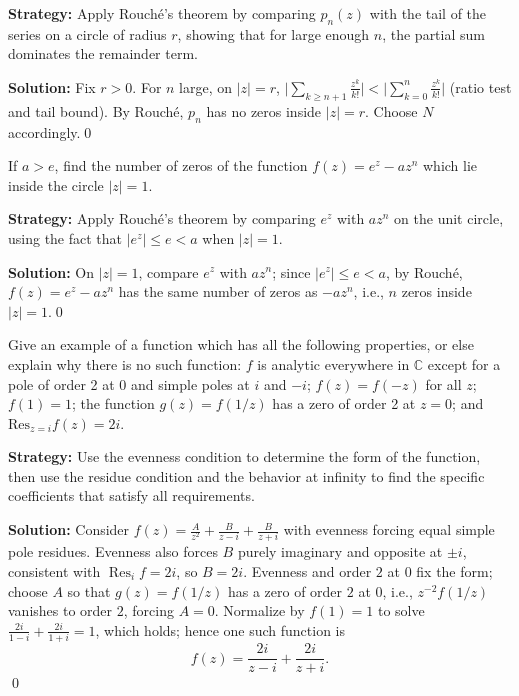 \noindent\textbf{Strategy:} Apply Rouché's theorem by comparing \( p_n(z) \) with the tail of the series on a circle of radius \( r \), showing that for large enough \( n \), the partial sum dominates the remainder term.

\bigskip\noindent\textbf{Solution:}
Fix $r>0$. For $n$ large, on $|z|=r$, $\big|\sum_{k\ge n+1} \frac{z^k}{k!}\big|<\big|\sum_{k=0}^{n} \frac{z^k}{k!}\big|$ (ratio test and tail bound). By Rouché, $p_n$ has no zeros inside $|z|=r$. Choose $N$ accordingly.\qed


\begin{problembox}
\begin{problemstatement}
If \( a > e \), find the number of zeros of the function \( f(z) = e^z - a z^n \) which lie inside the circle \( |z| = 1 \).
\end{problemstatement}
\end{problembox}

\noindent\textbf{Strategy:} Apply Rouché's theorem by comparing \( e^z \) with \( a z^n \) on the unit circle, using the fact that \( |e^z| \leq e < a \) when \( |z| = 1 \).

\bigskip\noindent\textbf{Solution:}
On $|z|=1$, compare $e^z$ with $a z^n$; since $|e^z|\le e< a$, by Rouché, $f(z)=e^z-az^n$ has the same number of zeros as $-az^n$, i.e., $n$ zeros inside $|z|=1$.\qed


\begin{problembox}
\begin{problemstatement}
Give an example of a function which has all the following properties, or else explain why there is no such function: \( f \) is analytic everywhere in \( \mathbb{C} \) except for a pole of order 2 at 0 and simple poles at \( i \) and \( -i \); \( f(z) = f(-z) \) for all \( z \); \( f(1) = 1 \); the function \( g(z) = f(1/z) \) has a zero of order 2 at \( z = 0 \); and \( \text{Res}_{z=i} f(z) = 2i \).
\end{problemstatement}
\end{problembox}

\noindent\textbf{Strategy:} Use the evenness condition to determine the form of the function, then use the residue condition and the behavior at infinity to find the specific coefficients that satisfy all requirements.

\bigskip\noindent\textbf{Solution:}
Consider $f(z)=\frac{A}{z^2}+\frac{B}{z-i}+\frac{B}{z+i}$ with evenness forcing equal simple pole residues. Evenness also forces $B$ purely imaginary and opposite at $\pm i$, consistent with $\operatorname{Res}_{i}f=2i$, so $B=2i$. Evenness and order $2$ at $0$ fix the form; choose $A$ so that $g(z)=f(1/z)$ has a zero of order $2$ at $0$, i.e., $z^{-2}f(1/z)$ vanishes to order $2$, forcing $A=0$. Normalize by $f(1)=1$ to solve $\frac{2i}{1-i}+\frac{2i}{1+i}=1$, which holds; hence one such function is
\[f(z)=\frac{2i}{z-i}+\frac{2i}{z+i}.
\]\qed


